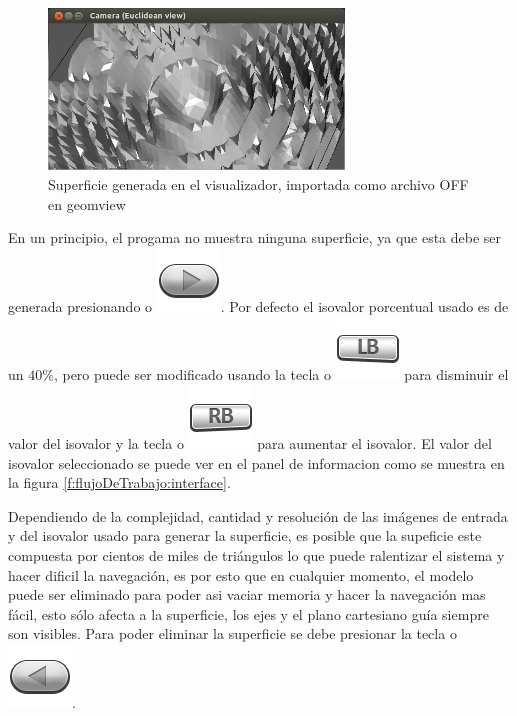 \begin{figure}[!htb]
\centering
	\includegraphics[width=0.7\textwidth]{images/visualizer/geomview.png}
\caption{Superficie generada en el visualizador, importada como archivo OFF en \mbox{geomview}}
\label{f:flujoDeTrabajo:geomview}
\end{figure}

\newpage
En un principio, el progama no muestra ninguna superficie, ya que esta debe ser generada presionando  o \includegraphics[scale=0.4, trim= 0 20 0 0]{images/visualizer/xbox360/start.png}. Por defecto el isovalor porcentual usado es de un $40\%$, pero puede ser modificado usando la tecla  o \includegraphics[scale=0.4, trim= 0 20 0 0]{images/visualizer/xbox360/leftShoulder0.png} para disminuir el valor del isovalor y la tecla  o \includegraphics[scale=0.4, trim= 0 20 0 0]{images/visualizer/xbox360/rightShoulder0.png} para aumentar el isovalor. El valor del isovalor seleccionado se puede ver en el panel de informacion como se muestra en la figura \ref{f:flujoDeTrabajo:interface}.

Dependiendo de la complejidad, cantidad y resolución de las imágenes de entrada y del isovalor usado para generar la superficie, es posible que la supeficie este compuesta por cientos de miles de triángulos lo que puede ralentizar el sistema y hacer dificil la navegación, es por esto que en cualquier momento, el modelo puede ser eliminado para poder asi vaciar memoria y hacer la navegación mas fácil, esto sólo afecta a la superficie, los ejes y el plano cartesiano guía siempre son visibles. Para poder eliminar la superficie se debe presionar la tecla  o \includegraphics[scale=0.4, trim= 0 20 0 0]{images/visualizer/xbox360/select.png}.

